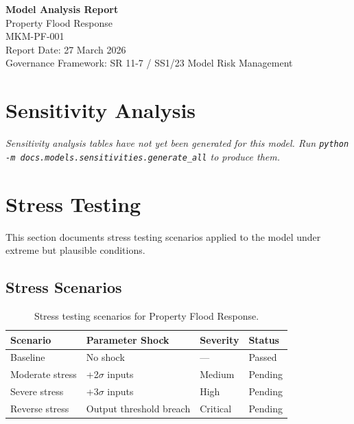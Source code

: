 \documentclass[11pt,a4paper]{article}
\begin{document}
\begin{center}
{\Large\textbf{Model Analysis Report}}\\[6pt]
{\large\textcolor{mkmblue}{Property Flood Response}}\\[4pt]
{\normalsize MKM-PF-001}\\[12pt]
{\small Report Date: 27 March 2026}\\[4pt]
{\footnotesize Governance Framework: SR 11-7 / SS1/23 Model Risk Management}
\end{center}

\vspace{8mm}
\tableofcontents
\newpage

\section{Sensitivity Analysis}

\textit{Sensitivity analysis tables have not yet been generated for this model.
Run \texttt{python -m docs.models.sensitivities.generate\_all} to produce them.}


\section{Stress Testing}

This section documents stress testing scenarios applied to the model
under extreme but plausible conditions.

\subsection{Stress Scenarios}

\begin{table}[H]
    \centering
    \caption{Stress testing scenarios for Property Flood Response.}
    \begin{tabular}{llll}
        \toprule
        \textbf{Scenario} & \textbf{Parameter Shock} & \textbf{Severity} & \textbf{Status} \\
        \midrule
        Baseline & No shock & --- & Passed \\
        Moderate stress & +2$\sigma$ inputs & Medium & Pending \\
        Severe stress & +3$\sigma$ inputs & High & Pending \\
        Reverse stress & Output threshold breach & Critical & Pending \\
        \bottomrule
    \end{tabular}
\end{table}
\end{document}
